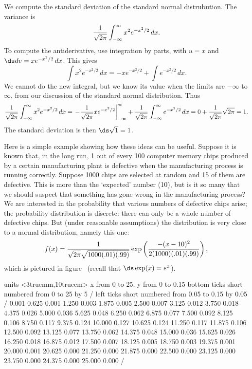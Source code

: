\begin{example} We compute the standard deviation of the standard normal
distrubution. The variance is
$${1\over\sqrt{2\pi}}\int_{-\infty}^\infty x^2 e^{-x^2/2}\,dx.$$
To compute the antiderivative, use integration by parts, with
$u=x$ and $\ds dv=xe^{-x^2/2}\,dx$. This gives
$$\int x^2 e^{-x^2/2}\,dx = -x e^{-x^2/2}+\int e^{-x^2/2}\,dx.$$
We cannot do the new integral, but we know its value when the limits
are $-\infty$ to $\infty$, from our discussion of the 
standard normal distribution. Thus
$$
  {1\over\sqrt{2\pi}}\int_{-\infty}^\infty x^2 e^{-x^2/2}\,dx=
  \left.-{1\over\sqrt{2\pi}}x e^{-x^2/2}\right|_{-\infty}^\infty + 
  {1\over\sqrt{2\pi}}\int_{-\infty}^\infty e^{-x^2/2}\,dx=
  0+{1\over\sqrt{2\pi}}\sqrt{2\pi}=1.
$$
The standard deviation is then $\ds \sqrt{1}=1$.
\end{example}
 
Here is a simple example showing how these ideas can be
useful. Suppose it is known that, in the long run, 1 out of every 100
computer memory chips produced by a certain manufacturing plant is
defective when the manufacturing process is running correctly. Suppose
1000 chips are selected at random and 15 of them are defective. This
is more than the `expected' number (10), but is it so many that we
should suspect that something has gone wrong in the manufacturing
process? We are interested in the probability that various numbers of
defective chips arise; the probability distribution is discrete: there
can only be a whole number of defective chips. But (under reasonable
assumptions) the distribution is very close to a normal
distribution, namely this one:
$$
  f(x)={1\over\sqrt{2\pi}\sqrt{1000(.01)(.99)}}
   \exp\left({-(x-10)^2\over 2(1000)(.01)(.99)}\right),
$$
which is pictured in figure~ 
(recall that $\ds \exp(x)=e^x$). 

\figure
\vbox{\beginpicture
\normalgraphs
\ninepoint
\setcoordinatesystem units <3truemm,10truecm>
\setplotarea x from 0 to 25, y from 0 to 0.15
\axis bottom ticks short numbered from 0 to 25 by 5 /
\axis left ticks short numbered from 0.05 to 0.15 by 0.05 /
\setquadratic
{} 0.001 0.625 0.001 1.250 0.003 1.875 0.005 2.500 0.007 
3.125 0.012 3.750 0.018 4.375 0.026 5.000 0.036 5.625 0.048 
6.250 0.062 6.875 0.077 7.500 0.092 8.125 0.106 8.750 0.117 
9.375 0.124 10.000 0.127 10.625 0.124 11.250 0.117 11.875 0.106 
12.500 0.092 13.125 0.077 13.750 0.062 14.375 0.048 15.000 0.036 
15.625 0.026 16.250 0.018 16.875 0.012 17.500 0.007 18.125 0.005 
18.750 0.003 19.375 0.001 20.000 0.001 20.625 0.000 21.250 0.000 
21.875 0.000 22.500 0.000 23.125 0.000 23.750 0.000 24.375 0.000 
25.000 0.000 /
\endpicture}

